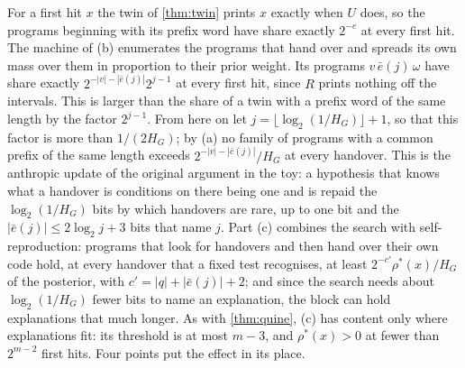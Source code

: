 For a first hit $x$ the twin of \cref{thm:twin} prints $x$ exactly when $U$ does, so the programs beginning
with its prefix word have share exactly $2^{-c}$ at every first hit. The machine of (b) enumerates the
programs that hand over and spreads its own mass over them in proportion to their prior weight. Its programs
$v\,\bar e(j)\,\omega$ have share exactly $2^{-|v|-|\bar e(j)|}2^{j-1}$ at every first hit, since $R$ prints
nothing off the intervals. This is larger than the share of a twin with a prefix word of the same length by
the factor $2^{j-1}$. From here on let $j=\lfloor\log_2(1/H_G)\rfloor+1$, so that this factor is more than
$1/(2H_G)$; by (a) no family of programs with a common prefix of the same length exceeds
$2^{-|v|-|\bar e(j)|}/H_G$ at every handover. This is the anthropic update of the original argument in the
toy: a hypothesis that knows what a handover is conditions on there being one and is repaid the
$\log_2(1/H_G)$ bits by which handovers are rare, up to one bit and the $|\bar e(j)|\le2\log_2j+3$ bits that
name $j$. Part (c) combines the search with self-reproduction: programs that look for handovers and
then hand over their own code hold, at every handover that a fixed test recognises, at least
$2^{-c'}\rho^*(x)/H_G$ of the posterior, with $c'=|q|+|\bar e(j)|+2$; and since the search needs about
$\log_2(1/H_G)$ fewer bits to name an explanation, the block can hold explanations that much longer. As with
\cref{thm:quine}, (c) has content only where explanations fit: its threshold is at most $m-3$, and
$\rho^*(x)>0$ at fewer than $2^{m-2}$ first hits. Four points put the effect in its place.
